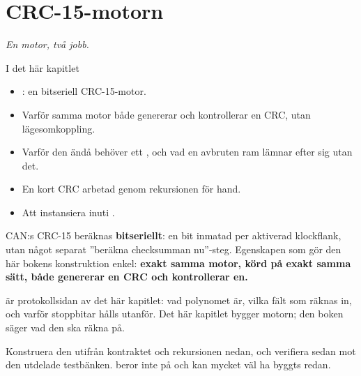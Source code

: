 
\chapter{CRC-15-motorn}
\label{c13:ch}

{\large\itshape En motor, två jobb.\par}

\begin{chapterbox}{I det här kapitlet}
\begin{itemize}
  \item {}: en bitseriell CRC-15-motor.
  \item Varför samma motor både genererar och kontrollerar en CRC, utan lägesomkoppling.
  \item Varför den ändå behöver ett , och vad en avbruten ram lämnar efter sig utan det.
  \item En kort CRC arbetad genom rekursionen för hand.
  \item Att instansiera  inuti .
\end{itemize}
\end{chapterbox}

CAN:s CRC-15 beräknas \textbf{bitseriellt}: en bit inmatad per aktiverad klockflank, utan något
separat ”beräkna checksumman nu”-steg. Egenskapen som gör den här bokens konstruktion enkel:
\textbf{exakt samma motor, körd på exakt samma sätt, både genererar en CRC och kontrollerar en.}

 är protokollsidan av det här kapitlet: vad polynomet är, vilka fält som räknas in, och
varför stoppbitar hålls utanför. Det här kapitlet bygger motorn; den boken säger vad den ska räkna
på.

Konstruera den utifrån kontraktet och rekursionen nedan, och verifiera sedan mot den utdelade
testbänken.  beror inte på  och kan mycket väl ha byggts redan.




